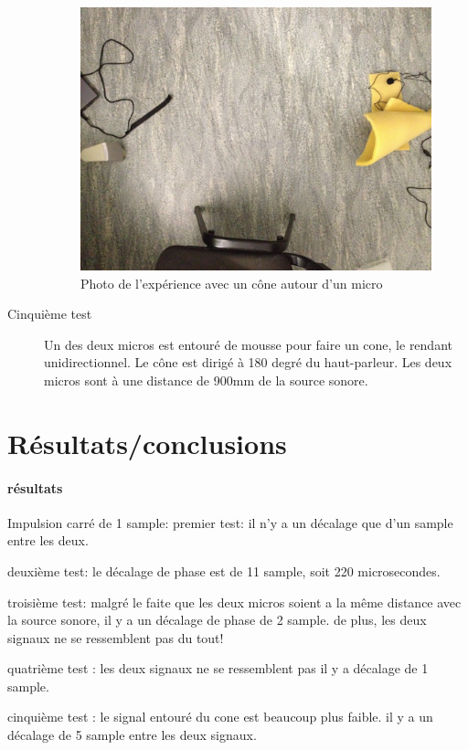 \documentclass[12pt,a4paper]{article}
\begin{document}
\begin{description}
\begin{figure}[H]
	\includegraphics[width=\textwidth]{../donnees11-03/test_4.jpg} 
	\caption{Photo de l'expérience avec un cône autour d'un micro}
	\end{figure}
\item[Cinquième test]	Un des deux micros est entouré de mousse pour faire un cone, le rendant unidirectionnel. Le cône est dirigé à 180 degré du haut-parleur. Les deux micros sont à une distance de 900mm de la source sonore.
\end{description}

\section{Résultats/conclusions}
\paragraph{résultats}
	Impulsion carré de 1 sample:
		premier test:
			il n'y a un décalage que d'un sample entre les deux.

		deuxième test:
			le décalage de phase est de 11 sample, soit 220 microsecondes.

		troisième test:
			malgré le faite que les deux micros soient a la même distance avec la source sonore, il y a un décalage de phase de 2 sample. de plus, les deux signaux ne se ressemblent pas du tout!

		quatrième test :
			les deux signaux ne se ressemblent pas
			il y a décalage de 1 sample.

		cinquième test :
			le signal entouré du cone est beaucoup plus faible.
			il y a un décalage de 5 sample entre les deux signaux.
\end{document}
